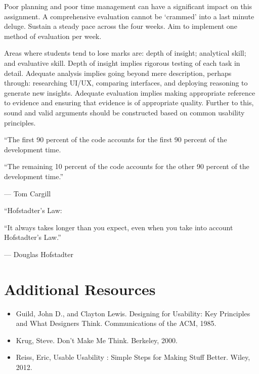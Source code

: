 \documentclass{../fal_assignment}
\begin{document}
Poor planning and poor time management can have a significant impact on this assignment. A comprehensive evaluation cannot be `crammed' into a last minute deluge. Sustain a steady pace across the four weeks. Aim to implement one method of evaluation per week.

Areas where students tend to lose marks are: depth of insight; analytical skill; and evaluative skill. Depth of insight implies rigorous testing of each task in detail. Adequate analysis implies going beyond mere description, perhaps through: researching UI/UX, comparing interfaces, and deploying reasoning to generate new insights. Adequate evaluation implies making appropriate reference to evidence and ensuring that evidence is of appropriate quality. Further to this, sound and valid arguments should be constructed based on common usability principles. 

\begin{marginquote}
    ``The first 90 percent of the code accounts for the first 90 percent of the development time.
    
    ``The remaining 10 percent of the code accounts for the other 90 percent of the development time.''
    
    --- Tom Cargill
    
    \marginquoterule
    
    ``Hofstadter's Law:
    
    ``It always takes longer than you expect, even when you take into account Hofstadter's Law.''
    
    --- Douglas Hofstadter
\end{marginquote}

\section*{Additional Resources}
\begin{itemize}
    \item Guild, John D., and Clayton Lewis. Designing for Usability: Key Principles and What Designers Think. Communications of the ACM, 1985.
    \item Krug, Steve. Don't Make Me Think. Berkeley, 2000. 
    \item Reiss, Eric, Usable Usability : Simple Steps for Making Stuff Better. Wiley, 2012.
\end{itemize}

\rubricyeartwo
\end{document}
